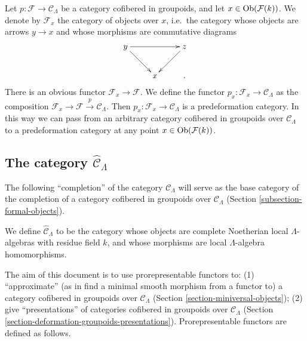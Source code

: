 \begin{remark}
\label{remark-localize-cofibered-groupoid} 
Let $p: \mathcal F \rightarrow \mathcal C_{\Lambda}$ be a category cofibered in 
groupoids, and let $x \in \textnormal{Ob}(\mathcal F(k))$.  We denote by 
$\mathcal F_{x}$ the category of objects over $x$, i.e.\ the category whose 
objects are arrows $y \rightarrow x$ and whose morphisms are commutative 
diagrams
\[
\xymatrix{
y \ar[rr] \ar[dr] &   & z \ar[dl] \\
                 & x &. 
}
\]
There is an obvious functor $\mathcal F_{x} \rightarrow \mathcal F$.  We define 
the functor $p_x: \mathcal F_{x} \rightarrow \mathcal C_{\Lambda}$ as the 
composition $\mathcal F_x \rightarrow \mathcal F \xrightarrow{p} \mathcal 
C_{\Lambda}$. Then $p_x : \mathcal F_x \rightarrow \mathcal C_{\Lambda}$ is a 
predeformation category.  In this way we can pass from an arbitrary category 
cofibered in groupoids over $\mathcal C_{\Lambda}$ to a predeformation category 
at any point $x \in \textnormal{Ob}(\mathcal F(k))$.
\end{remark}

\subsection{The category $\widehat{\mathcal C}_{\Lambda}$}
\label{subsection-category-completion-CLambda}

\noindent
The following ``completion'' of the category $\mathcal C_{\Lambda}$ will serve 
as the base category of the completion of a category cofibered in groupoids 
over $\mathcal C_{\Lambda}$ (Section \ref{subsection-formal-objects}).

\begin{definition}
\label{definition-completion-CLambda}
We define {\it $\widehat{\mathcal C}_{\Lambda}$}
to be the category whose objects are 
complete Noetherian local $\Lambda$-algebras with residue field $k$, and whose 
morphisms are local $\Lambda$-algebra homomorphisms.
\end{definition}

\noindent
The aim of this document is to use prorepresentable functors to: (1) 
``approximate'' (as in find a minimal smooth morphism from a functor to) a 
category cofibered in groupoids over $\mathcal C_{\Lambda}$ (Section 
\ref{section-miniversal-objects}); (2) give ``presentations'' of categories 
cofibered in groupoids over $\mathcal C_{\Lambda}$ (Section 
\ref{section-deformation-groupoids-presentations}).  Prorepresentable functors 
are defined as follows.

